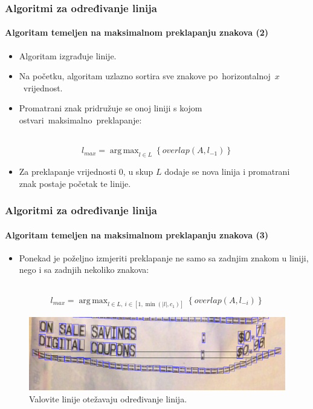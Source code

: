 \documentclass{beamer}
\DeclareMathOperator*{\argmax}{arg\,max}
\begin{document}
\begin{frame}
\frametitle{Algoritmi za određivanje linija}
\framesubtitle{Algoritam temeljen na maksimalnom preklapanju znakova (2)}
\begin{itemize}
    \item Algoritam izgrađuje linije.
    \item Na početku, algoritam uzlazno sortira sve znakove po~horizontalnoj~$x$~vrijednost.
    \item Promatrani znak pridružuje se onoj liniji s kojom ostvari~maksimalno~preklapanje:
\end{itemize}
\
\begin{equation}
\label{eq:overlap-01}
l_{max} = \argmax_{l \in L}\left\{\textit{overlap}(A, l_{-1})\right\}
\end{equation}
\begin{itemize}
    \item Za preklapanje vrijednosti 0, u skup $L$ dodaje se nova linija i
          promatrani znak postaje početak te linije.
\end{itemize}
\end{frame}
\begin{frame}
\frametitle{Algoritmi za određivanje linija}
\framesubtitle{Algoritam temeljen na maksimalnom preklapanju znakova (3)}
\begin{itemize}
\item Ponekad je poželjno izmjeriti preklapanje ne samo sa zadnjim znakom u liniji,
nego i sa zadnjih nekoliko znakova:
\end{itemize}
\
\begin{equation}
\label{eq:overlap-02}
l_{max} = \argmax_{l \in L,\ i \in [1, \min(|l|, c_1)]}\left\{\textit{overlap}
(A, l_{-i})\right\}
\end{equation}
\begin{figure}[htb]
    \centering
    \includegraphics[width=.9\textwidth]{images/aligner-01.png}
    \caption{Valovite linije otežavaju određivanje linija.}
    \label{fig:aligner-01}
\end{figure}
\end{frame}
\end{document}
